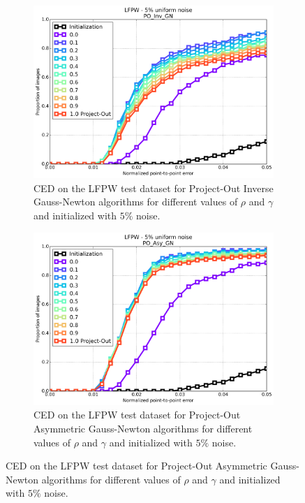 \begin{figure}[p]
\begin{subfigure}{0.48\textwidth}
	    \includegraphics[width=\textwidth]{experiments/rho/ced_po_inv_gn_5.png}
	    \caption{CED on the LFPW test dataset for Project-Out Inverse Gauss-Newton algorithms for different values of $\rho$ and $\gamma$ and initialized with $5\%$ noise.}
	    \label{fig:ced_po_inv_gn}
	\end{subfigure}
	\par\bigskip
	\begin{subfigure}{0.48\textwidth}
	    \includegraphics[width=\textwidth]{experiments/rho/ced_po_asy_gn_5.png}
	    \caption{CED on the LFPW test dataset for Project-Out Asymmetric Gauss-Newton algorithms for different values of $\rho$ and $\gamma$ and initialized with $5\%$ noise.}
	    \label{fig:ced_po_asy_gn}
	\end{subfigure}
	\hfill

\end{figure}
